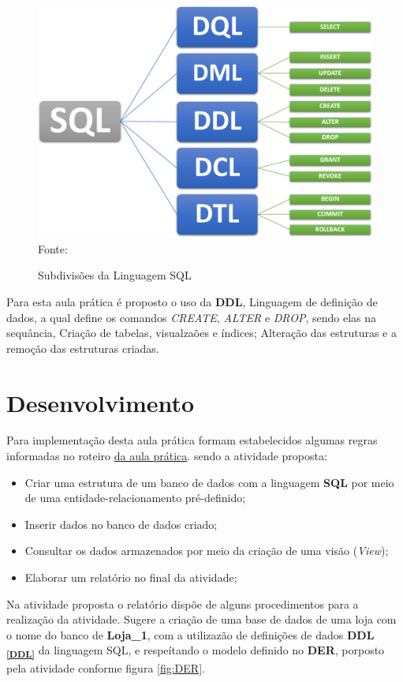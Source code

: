 \begin{figure}[h!]
  \caption{Subdivisões da Linguagem SQL}
  \includegraphics[width=\textwidth]{figure/div_SQL.png}
  \label{fig:div_sql}
  {\fontsize{10pt}{\baselineskip}\selectfont
  Fonte:   }
\end{figure}
\par Para esta aula prática é proposto o uso da \textbf{DDL}, Linguagem de definição de dados, a qual define os comandos \textit{CREATE}, \textit{ALTER} e \textit{DROP}, sendo elas na sequância, Criação de tabelas, visualzaões e índices; Alteração das estruturas e a remoção das estruturas criadas.

\section{Desenvolvimento}
\par Para implementação desta aula prática formam estabelecidos algumas regras informadas no roteiro \href{https://github.com/OgliariNatan/database_and_data_development/blob/main/aula%20pr%C3%A1tica.pdf}{da aula prática}. sendo a atividade proposta:
\begin{itemize}
  \item Criar uma estrutura de um banco de dados com a linguagem \textbf{SQL} por meio de uma entidade-relacionamento pré-definido;
  \item Inserir dados no banco de dados criado;
  \item Consultar os dados armazenados por meio da criação de uma visão (\textit{View});
  \item Elaborar um relatório no final da atividade;
\end{itemize}
\par Na atividade proposta o relatório dispõe de alguns procedimentos para a realização da atividade. Sugere a criação de uma base de dados de uma loja com o nome do banco de \textbf{Loja\_1}, com a utilizazão de definições de dados \textbf{DDL  \textsubscript{\ref{DDL}}} da linguagem SQL, e respeítando o modelo definido no \textbf{DER}, porposto pela atividade conforme figura \ref{fig:DER}.

